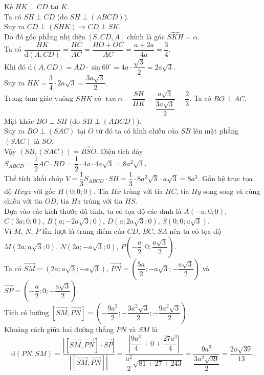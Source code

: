 \begin{ex}
{\begin{itemchoice}
			\itemch Kẻ $HK \perp CD$ tại $K$.\\
			Ta có $SH \perp CD$ (do $SH \perp (ABCD)$).\\
			Suy ra $CD \perp (SHK) \Rightarrow CD \perp SK$.\\
			Do đó góc phẳng nhị diện $[S,CD,A]$ chính là góc $\widehat{SKH} = \alpha$.\\
			Ta có $\dfrac{HK}{\mathrm{d}(A,CD)} = \dfrac{HC}{AC} = \dfrac{HO + OC}{AC} = \dfrac{a + 2a}{4a} = \dfrac{3}{4}$.\\
			Khi đó $\mathrm{d}(A,CD) = AD \cdot \sin 60^\circ = 4a \cdot \dfrac{\sqrt{3}}{2} = 2a\sqrt{3}$.\\
			Suy ra $HK = \dfrac{3}{4} \cdot 2a\sqrt{3} = \dfrac{3a\sqrt{3}}{2}$.\\
			Trong tam giác vuông $SHK$ có $\tan\alpha = \dfrac{SH}{HK} = \dfrac{a\sqrt{3}}{\dfrac{3a\sqrt{3}}{2}} = \dfrac{2}{3}$.			
			\itemch Ta có $BO \perp AC$.\\
			Mặt khác $BO \perp SH$ (do $SH \perp (ABCD)$).\\
			Suy ra $BO \perp (SAC)$ tại $O$ từ đó ta có hình chiếu của $SB$ lên mặt phẳng $(SAC)$ là $SO$.\\
			Vậy $(SB,(SAC))=\widehat{BSO}$. 			
			\itemch Diện tích đáy $S_{ABCD} = \dfrac{1}{2} AC \cdot BD = \dfrac{1}{2} \cdot 4a \cdot 4a\sqrt{3} = 8a^2\sqrt{3}$.\\
			Thể tích khối chóp $V = \dfrac{1}{3} S_{ABCD} \cdot SH = \dfrac{1}{3} \cdot 8a^2\sqrt{3} \cdot a\sqrt{3} = 8a^3$.			
			\itemch Gắn hệ trục tọa độ $Hxyz$ với gốc $H(0;0;0)$. Tia $Hx$ trùng với tia $HC$, tia $Hy$ song song và cùng chiều với tia $OD$, tia $Hz$ trùng với tia $HS$.\\
			Dựa vào các kích thước đã tính, ta có tọa độ các đỉnh là
			$A(-a;0;0)$, $C(3a;0;0)$, $B\left(a;-2a\sqrt{3};0\right)$, $D\left(a;2a\sqrt{3};0\right)$, $S\left(0;0;a\sqrt{3}\right)$.\\
			Vì $M$, $N$, $P$ lần lượt là trung điểm của $CD$, $BC$, $SA$ nên ta có tọa độ
			$M\left(2a;a\sqrt{3};0\right)$, $N\left(2a;-a\sqrt{3};0\right)$, $P\left(-\dfrac{a}{2};0;\dfrac{a\sqrt{3}}{2}\right)$.\\
			Ta có $\overrightarrow{SM} = (2a;a\sqrt{3};-a\sqrt{3})$, $\overrightarrow{PN} = \left(\dfrac{5a}{2};-a\sqrt{3};-\dfrac{a\sqrt{3}}{2}\right)$ và $\overrightarrow{SP} = \left(-\dfrac{a}{2};0;-\dfrac{a\sqrt{3}}{2}\right)$.\\
			Tích có hướng $\left[\overrightarrow{SM}, \overrightarrow{PN}\right] = \left(-\dfrac{9a^2}{2}; -\dfrac{3a^2\sqrt{3}}{2}; -\dfrac{9a^2\sqrt{3}}{2}\right)$.\\
			Khoảng cách giữa hai đường thẳng $PN$ và $SM$ là\\
			\[			
			\mathrm{d}(PN,SM) = \dfrac{\left|\left[\overrightarrow{SM}, \overrightarrow{PN}\right] \cdot \overrightarrow{SP}\right|}{\left|\left[\overrightarrow{SM}, \overrightarrow{PN}\right]\right|} = \dfrac{\left|\dfrac{9a^3}{4} + 0 + \dfrac{27a^3}{4}\right|}{\dfrac{a^2}{2}\sqrt{81 + 27 + 243}} = \dfrac{9a^3}{\dfrac{3a^2\sqrt{39}}{2}} = \dfrac{2a\sqrt{39}}{13}.
			\]			
		\end{itemchoice}
	}
\end{ex}

